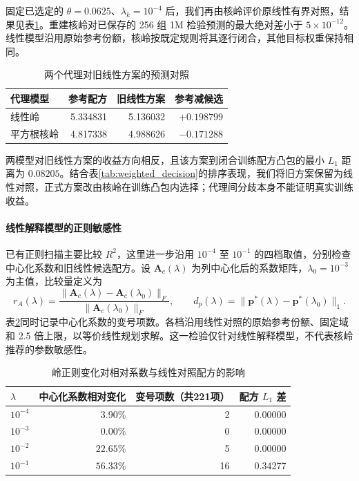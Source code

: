 固定已选定的 $\theta=0.0625$、$\lambda_k=10^{-4}$ 后，我们再由核岭评价原线性有界对照，结果见表\ref{tab:q1_review_surrogates}。重建核岭对已保存的 256 组 1M 检验预测的最大绝对差小于 $5\times10^{-12}$。线性模型沿用原始参考份额，核岭按既定规则将其逐行闭合，其他目标权重保持相同。

\begin{table}[htbp]
\centering
\caption{两个代理对旧线性方案的预测对照}
\label{tab:q1_review_surrogates}
\begin{tabular}{@{}lrrr@{}}
\toprule
代理模型 & 参考配方 & 旧线性方案 & 参考减候选 \\
\midrule
线性岭 & 5.334831 & 5.136032 & $+0.198799$ \\
平方根核岭 & 4.817338 & 4.988626 & $-0.171288$ \\
\bottomrule
\end{tabular}
\end{table}

两模型对旧线性方案的收益方向相反，且该方案到闭合训练配方凸包的最小 $L_1$ 距离为 $0.08205$。结合表\ref{tab:weighted_decision}的排序表现，我们将旧方案保留为线性对照，正式方案改由核岭在训练凸包内选择；代理间分歧本身不能证明真实训练收益。

\paragraph{线性解释模型的正则敏感性}
已有正则扫描主要比较 $R^2$，这里进一步沿用 $10^{-4}$ 至 $10^{-1}$ 的四档取值，分别检查中心化系数和旧线性候选配方。设 $\bm A_c(\lambda)$ 为列中心化后的系数矩阵，$\lambda_0=10^{-3}$ 为主值，比较量定义为
\[
 r_A(\lambda)=\frac{\|\bm A_c(\lambda)-\bm A_c(\lambda_0)\|_F}
 {\|\bm A_c(\lambda_0)\|_F},\qquad
 d_p(\lambda)=\|\bm p^*(\lambda)-\bm p^*(\lambda_0)\|_1.
\]
表\ref{tab:q1_review_ridge}同时记录中心化系数的变号项数。各档沿用线性对照的原始参考份额、固定域和 2.5 倍上限，以等价线性规划求解。这一检验仅针对线性解释模型，不代表核岭推荐的参数敏感性。

\begin{table}[htbp]
\centering
\caption{岭正则变化对相对系数与线性对照配方的影响}
\label{tab:q1_review_ridge}
\begin{tabular}{@{}lrrr@{}}
\toprule
$\lambda$ & 中心化系数相对变化 & 变号项数（共221项） & 配方 $L_1$ 差 \\
\midrule
$10^{-4}$ & $3.90\%$ & 2 & 0.00000 \\
$10^{-3}$ & $0.00\%$ & 0 & 0.00000 \\
$10^{-2}$ & $22.65\%$ & 5 & 0.00000 \\
$10^{-1}$ & $56.33\%$ & 16 & 0.34277 \\
\bottomrule
\end{tabular}
\end{table}

